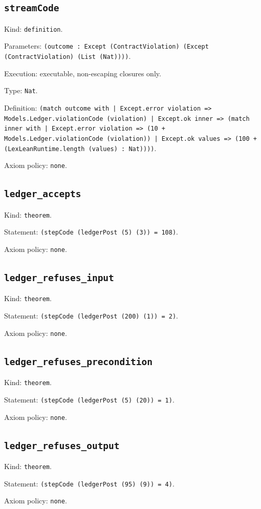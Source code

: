 \documentclass[11pt]{article}
\begin{document}
\subsection*{\texttt{streamCode}}
\noindent Kind: \texttt{definition}.\par
\noindent Parameters: \texttt{(outcome : Except (ContractViolation) (Except (ContractViolation) (List (Nat))))}.\par
\noindent Execution: executable, non-escaping closures only.\par
\noindent Type: \texttt{Nat}.\par
\noindent Definition: \texttt{(match outcome with | Except.error violation => Models.Ledger.violationCode (violation) | Except.ok inner => (match inner with | Except.error violation => (10 + Models.Ledger.violationCode (violation)) | Except.ok values => (100 + (LexLeanRuntime.length (values) : Nat))))}.\par
\noindent Axiom policy: \texttt{none}.\par
\subsection*{\texttt{ledger\_accepts}}
\noindent Kind: \texttt{theorem}.\par
\noindent Statement: \texttt{(stepCode (ledgerPost (5) (3)) = 108)}.\par
\noindent Axiom policy: \texttt{none}.\par
\subsection*{\texttt{ledger\_refuses\_input}}
\noindent Kind: \texttt{theorem}.\par
\noindent Statement: \texttt{(stepCode (ledgerPost (200) (1)) = 2)}.\par
\noindent Axiom policy: \texttt{none}.\par
\subsection*{\texttt{ledger\_refuses\_precondition}}
\noindent Kind: \texttt{theorem}.\par
\noindent Statement: \texttt{(stepCode (ledgerPost (5) (20)) = 1)}.\par
\noindent Axiom policy: \texttt{none}.\par
\subsection*{\texttt{ledger\_refuses\_output}}
\noindent Kind: \texttt{theorem}.\par
\noindent Statement: \texttt{(stepCode (ledgerPost (95) (9)) = 4)}.\par
\noindent Axiom policy: \texttt{none}.\par
\end{document}
